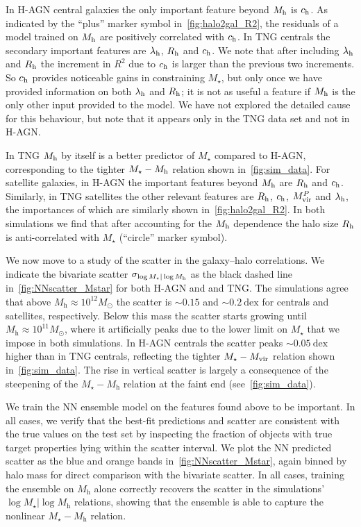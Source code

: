 \documentclass[useAMS,usenatbib]{mnras}
\begin{document}
In H-AGN central galaxies the only important feature beyond $M_{\rm h}$ is $c_{\rm h}$. As indicated by the ``plus'' marker symbol in~\cref{fig:halo2gal_R2}, the residuals of a model trained on $M_{\rm h}$ are positively correlated with $c_{\rm h}$. In TNG centrals the secondary important features are $\lambda_{\rm h}$, $R_{\rm h}$ and $c_{\rm h}$. We note that after including $\lambda_{\rm h}$ and $R_{\rm h}$ the increment in $R^2$ due to $c_{\rm h}$ is larger than the previous two increments. So $c_{\rm h}$ provides noticeable gains in constraining $M_\star$, but only once we have provided information on both $\lambda_{\rm h}$ and $R_{\rm h}$; it is not as useful a feature if $M_{\rm h}$ is the only other input provided to the model. We have not explored the detailed cause for this behaviour, but note that it appears only in the TNG data set and not in H-AGN.

In TNG $M_{\rm h}$ by itself is a better predictor of $M_\star$ compared to H-AGN, corresponding to the tighter $M_\star - M_{\rm h}$ relation shown in~\cref{fig:sim_data}. For satellite galaxies, in H-AGN the important features beyond $M_{\rm h}$ are $R_{\rm h}$ and $c_{\rm h}$. Similarly, in TNG satellites the other relevant features are $R_{\rm h}$, $c_{\rm h}$, $M_{\rm vir}^{P}$ and $\lambda_{\rm h}$, the importances of which are similarly shown in~\cref{fig:halo2gal_R2}. In both simulations we find that after accounting for the $M_{\rm h}$ dependence the halo size $R_{\rm h}$ is anti-correlated with $M_\star$ (``circle'' marker symbol).


We now move to a study of the scatter in the galaxy--halo correlations. We indicate the bivariate scatter $\sigma_{\log M_\star | \log M_{\rm h}}$ as the black dashed line in~\cref{fig:NNscatter_Mstar} for both H-AGN and and TNG. The simulations agree that above $M_\mathrm{h} \approx 10^{12} M_\odot$ the scatter is $\sim0.15$ and $\sim0.2~\mathrm{dex}$ for centrals and satellites, respectively. Below this mass the scatter starts growing until $M_\mathrm{h} \approx 10^{11} M_\odot$, where it artificially peaks due to the lower limit on $M_\star$ that we impose in both simulations. In H-AGN centrals the scatter peaks $\sim 0.05~\mathrm{dex}$ higher than in TNG centrals, reflecting the tighter $M_\star - M_{\rm vir}$ relation shown in~\cref{fig:sim_data}. The rise in vertical scatter is largely a consequence of the steepening of the $M_\star-M_\text{h}$ relation at the faint end (see~\cref{fig:sim_data}).

We train the NN ensemble model on the features found above to be important. In all cases, we verify that the best-fit predictions and scatter are consistent with the true values on the test set by inspecting the fraction of objects with true target properties lying within the scatter interval. We plot the NN predicted scatter as the blue and orange bands in~\cref{fig:NNscatter_Mstar}, again binned by halo mass for direct comparison with the bivariate scatter. In all cases, training the ensemble on $M_\mathrm{h}$ alone correctly recovers the scatter in the simulations' $\log M_\star | \log M_\mathrm{h}$ relations, showing that the ensemble is able to capture the nonlinear $M_\star-M_\text{h}$ relation.
\end{document}
